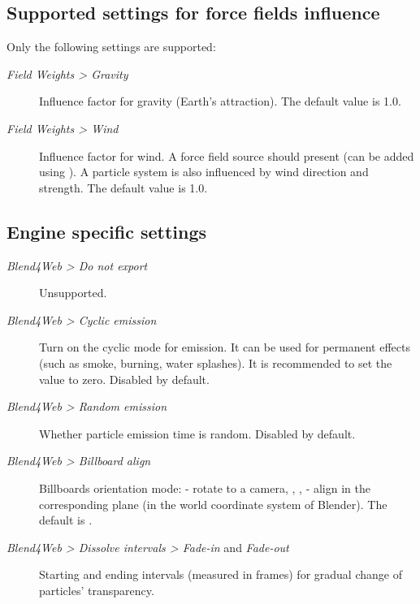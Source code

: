 \documentclass[a4paper,12pt,oneside]{sphinxmanual}
\begin{document}
\subsection{Supported settings for force fields influence}
\label{particles:id12}\label{particles:particles-force-fields}
Only the following settings are supported:
\begin{description}
\item[{\emph{Field Weights \textgreater{} Gravity}}] \leavevmode
Influence factor for gravity (Earth's attraction). The default value is 1.0.

\item[{\emph{Field Weights \textgreater{} Wind}}] \leavevmode
Influence factor for wind. A  force field source should present (can be added using ). A particle system is also influenced by wind direction and strength. The default value is 1.0.

\end{description}


\subsection{Engine specific settings}
\label{particles:id13}\begin{description}
\item[{\emph{Blend4Web \textgreater{} Do not export}}] \leavevmode
Unsupported.

\item[{\emph{Blend4Web \textgreater{} Cyclic emission}}] \leavevmode
Turn on the cyclic mode for emission. It can be used for permanent effects (such as smoke, burning, water splashes). It is recommended to set the  value to zero. Disabled by default.

\item[{\emph{Blend4Web \textgreater{} Random emission}}] \leavevmode
Whether particle emission time is random. Disabled by default.

\item[{\emph{Blend4Web \textgreater{} Billboard align}}] \leavevmode
Billboards orientation mode:  - rotate to a camera, , ,  - align in the corresponding plane (in the world coordinate system of Blender). The default is .

\item[{\emph{Blend4Web \textgreater{} Dissolve intervals \textgreater{} Fade-in} and \emph{Fade-out}}] \leavevmode
Starting and ending intervals (measured in frames) for gradual change of particles' transparency.

\end{description}
\end{document}
